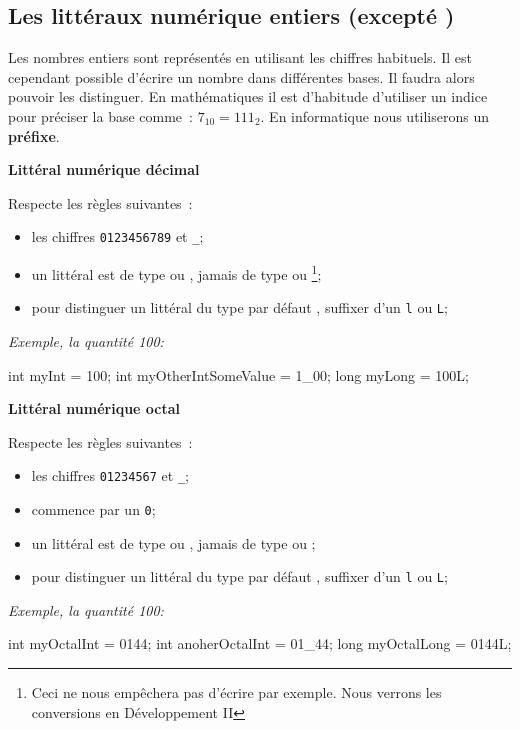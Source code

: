 \subsection{Les littéraux numérique entiers (excepté )}

Les nombres entiers sont représentés en utilisant les chiffres habituels. Il
est cependant possible d'écrire un nombre dans différentes bases. Il faudra
alors pouvoir les distinguer. En mathématiques il est d'habitude d'utiliser un
indice pour préciser la base comme : $7_{10} = 111_2$. En informatique nous
utiliserons un \textbf{préfixe}.

\textbf{Littéral numérique décimal}

Respecte les règles suivantes~:

\begin{itemize}
	\item les chiffres \texttt{0123456789} et \texttt{\_};
	\item un littéral est de type  ou , jamais de type 
		 ou \footnote{Ceci ne nous empêchera pas d'écrire 
		 par exemple. Nous verrons les conversions en 
		Développement II};
	\item pour distinguer un littéral  du type par défaut , suffixer 
		d'un \texttt{l} ou \texttt{L};
\end{itemize}

\textit{Exemple, la quantité 100: }
\begin{java}
	int myInt = 100;
	int myOtherIntSomeValue = 1_00;
	long myLong = 100L;
\end{java}

\textbf{Littéral numérique octal}

Respecte les règles suivantes~:

\begin{itemize}
	\item les chiffres \texttt{01234567} et \texttt{\_};
	\item commence par un \texttt{0};
	\item un littéral est de type  ou , jamais de type 
		 ou ;
	\item pour distinguer un littéral  du type par défaut , suffixer 
		d'un \texttt{l} ou \texttt{L};
\end{itemize}

\textit{Exemple, la quantité 100: }
\begin{java}
	int myOctalInt = 0144;
	int anoherOctalInt = 01_44;
	long myOctalLong = 0144L;
\end{java}

